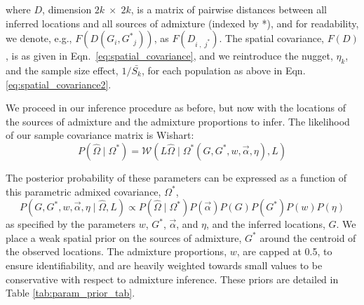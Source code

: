 \documentclass[12pt]{article}
\newcommand{\identifyadmixsource}[1]{{#1^{*}}}
\begin{document}
where $D$, dimension $2k \; \times \; 2k$, is a matrix of pairwise distances between all inferred locations and all sources of admixture (indexed by *), and for readability, we denote, e.g., $F(D(G_i,\identifyadmixsource{G}_j))$, as $F(D_{i\;,\;\identifyadmixsource{j}})$.
The spatial covariance, $F(D)$, is as given in Eqn.\ \eqref{eq:spatial_covariance}, and we reintroduce the nugget, $\eta_k$, and the sample size effect, $1/\bar{S_k}$, for each population as above in Eqn. \eqref{eq:spatial_covariance2}.

We proceed in our inference procedure as before, but now with the locations of the sources of admixture and the admixture proportions to infer.
The likelihood of our sample covariance matrix is Wishart:
\begin{equation}
\label{eq:wishart_dist_admixed}
P(\widehat{\Omega} \mid \identifyadmixsource{\Omega}) = 
	\mathcal{W}\left(L \widehat{\Omega} \mid \identifyadmixsource{\Omega} \left( G,\identifyadmixsource{G}, w,\vec{\alpha},\eta \right),L \right)
\end{equation}

The posterior probability of these parameters can be expressed as a function of this parametric admixed covariance, $\identifyadmixsource{\Omega}$,
\begin{equation}
\label{eq:admixed_post_prob}
P(G,\identifyadmixsource{G}, w,\vec{\alpha}, \eta \mid \widehat{\Omega}, L) 
	\propto  
		P(\widehat{\Omega}  \mid \identifyadmixsource{\Omega}) P(\vec{\alpha}) P(G) P(\identifyadmixsource{G}) P(w) P(\eta) 
\end{equation}
as specified by the parameters $w$, $\identifyadmixsource{G}$, $\vec{\alpha}$, and $\eta$, and the inferred locations, $G$.  
We place a weak spatial prior on the sources of admixture, $\identifyadmixsource{G}$ around the centroid of the observed locations. The admixture proportions, $w$, are capped at 0.5, to ensure identifiability,
and are heavily weighted towards small values to be conservative with respect to admixture inference.  
These priors are detailed in Table \ref{tab:param_prior_tab}.
\end{document}
